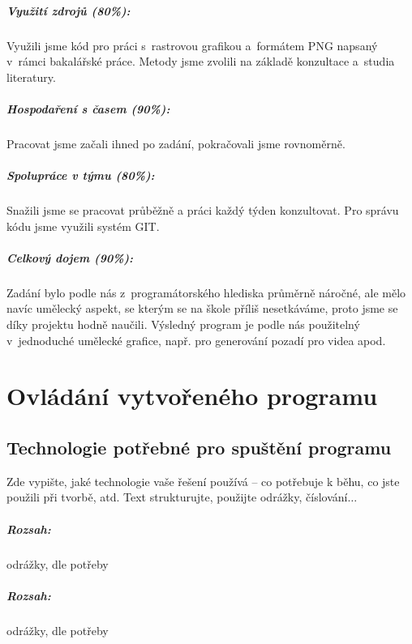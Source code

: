 \documentclass[12pt,a4paper,titlepage,final]{report}
\begin{document}
\paragraph{Využití zdrojů (80\%):}
Využili jsme kód pro práci s~rastrovou grafikou a~formátem PNG napsaný v~rámci
bakalářské práce. Metody jsme zvolili na základě konzultace a~studia
literatury.

\paragraph{Hospodaření s časem (90\%):}
Pracovat jsme začali ihned po zadání, pokračovali jsme rovnoměrně.

\paragraph{Spolupráce v týmu (80\%):}
Snažili jsme se pracovat průběžně a práci každý týden konzultovat. Pro
správu kódu jsme využili systém GIT.

\paragraph{Celkový dojem (90\%):}
Zadání bylo podle nás z~programátorského hlediska průměrně náročné, ale
mělo navíc umělecký aspekt, se kterým se na škole příliš nesetkáváme,
proto jsme se díky projektu hodně naučili. Výsledný program je podle
nás použitelný v~jednoduché umělecké grafice, např. pro generování pozadí
pro videa apod.

\chapter{Ovládání vytvořeného programu}

\section{Technologie potřebné pro spuštění programu}
Zde vypište, jaké technologie vaše řešení používá – co potřebuje k běhu, co
jste použili při tvorbě, atd. Text strukturujte, použijte odrážky,
číslování$\ldots$

\paragraph{Rozsah:} odrážky, dle potřeby


\paragraph{Rozsah:} odrážky, dle potřeby
\end{document}
